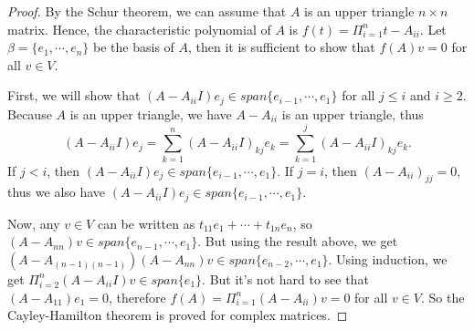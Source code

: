 \documentclass[12pt, a4paper]{article}
\theoremstyle{plain}
\begin{document}
	\begin{proof}
	By the Schur theorem, we can assume that $A$ is an upper triangle $n\times n$ matrix. Hence, the characteristic polynomial of $A$ is $f(t) = \Pi_{i=1}^{n}{t-A_{ii}}$. Let $\beta = \{e_1,\cdots,e_n\}$ be the basis of $A$, then it is sufficient to show that $f(A)v=0$ for all $v\in V$.
	
	First, we will show that $(A-A_{ii}I)e_j\in span\{e_{i-1},\cdots,e_1\}$ for all $j\leq i$ and $i\geq 2$. Because $A$ is an upper triangle, we have $A-A_{ii}$ is an upper triangle, thus
	\[
	(A-A_{ii}I)e_j = \sum_{k=1}^{n}{(A-A_{ii}I)_{kj}e_k} = \sum_{k=1}^{j}{(A-A_{ii}I)_{kj}e_k}.
	\]
	If $j<i$, then $(A-A_{ii}I)e_j\in span\{e_{i-1},\cdots,e_1\}$. If $j=i$, then $(A-A_{ii})_{jj}=0$, thus we also have $(A-A_{ii}I)e_j\in span\{e_{i-1},\cdots,e_1\}$.
	
	Now, any $v\in V$ can be written as $t_{11}e_1+\cdots+t_{1n}e_n$, so $(A-A_{nn})v\in span\{e_{n-1},\cdots,e_{1}\}$. But using the result above, we get $(A-A_{(n-1)(n-1)})(A-A_{nn})v\in span\{e_{n-2},\cdots,e_1\}$. Using induction, we get $\Pi_{i=2}^{n}(A-A_{ii}I)v\in span\{e_1\}$. But it's not hard to see that $(A-A_{11})e_1=0$, therefore $f(A) = \Pi_{i=1}^n(A-A_{ii})v=0$ for all $v\in V$. So the Cayley-Hamilton theorem is proved for complex matrices.
	\end{proof}
\end{document}

